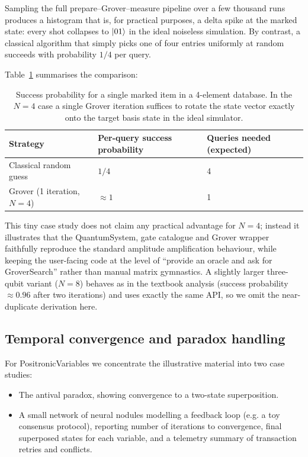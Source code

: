 \documentclass[a4paper,11pt]{article}
\begin{document}
Sampling the full prepare–Grover–measure pipeline over a few thousand runs produces a histogram that is, for practical purposes, a delta spike at the marked state: every shot collapses to \(\lvert 01 \rangle\) in the ideal noiseless simulation. By contrast, a classical algorithm that simply picks one of four entries uniformly at random succeeds with probability \(1/4\) per query.

Table~\ref{tab:grover-2q-success} summarises the comparison:

\begin{table}[htbp]
  \centering
  \begin{tabular}{@{}lll@{}}
    \toprule
    \textbf{Strategy} &
    \textbf{Per-query success probability} &
    \textbf{Queries needed (expected)} \\
    \midrule
    Classical random guess & \(1/4\) & 4 \\
    Grover (1 iteration, \(N = 4\)) & \(\approx 1\) & 1 \\
    \bottomrule
  \end{tabular}
  \caption{Success probability for a single marked item in a 4-element database. In the \(N = 4\) case a single Grover iteration suffices to rotate the state vector exactly onto the target basis state in the ideal simulator.}
  \label{tab:grover-2q-success}
\end{table}

This tiny case study does not claim any practical advantage for \(N = 4\); instead it illustrates that the QuantumSystem, gate catalogue and Grover wrapper faithfully reproduce the standard amplitude amplification behaviour, while keeping the user-facing code at the level of ``provide an oracle and ask for GroverSearch'' rather than manual matrix gymnastics. A slightly larger three-qubit variant (\(N = 8\)) behaves as in the textbook analysis (success probability \(\approx 0.96\) after two iterations) and uses exactly the same API, so we omit the near-duplicate derivation here.

\subsection{Temporal convergence and paradox handling}
\label{sec:positronic-case-studies}

For PositronicVariables we concentrate the illustrative material into two case studies:

\begin{itemize}
\item
  The antival paradox, showing convergence to a two-state superposition.
\item
  A small network of neural nodules modelling a feedback loop (e.g. a toy consensus protocol), reporting number of iterations to convergence, final superposed states for each variable, and a telemetry summary of transaction retries and conflicts.
\end{itemize}
\end{document}

